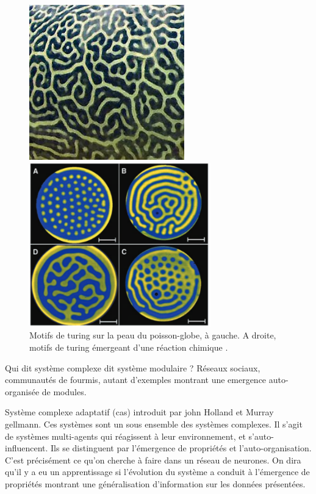 \begin{figure}
\begin{minipage}{0.5\textwidth}
\centering
\includegraphics[width=0.6\textwidth]{220px-Giant_Pufferfish_skin_pattern_detail.jpg}
\end{minipage}
\begin{minipage}{0.5\textwidth}
\centering
\includegraphics[width=0.7\textwidth]{turing_pattern_chem.pdf}
\end{minipage}
\caption{Motifs de turing sur la peau du poisson-globe, à gauche. A droite, motifs de turing émergeant d'une réaction chimique \cite{Horvth2009AnED}.}
\label{fig:turing_pattern}
\end{figure}

Qui dit système complexe dit système modulaire ?
Réseaux sociaux, communautés de fourmis, autant d'exemples montrant une emergence auto-organisée de modules. 


Système complexe adaptatif (cas) introduit par john Holland et Murray gellmann.
Ces systèmes sont un sous ensemble des systèmes complexes. Il s'agit de systèmes multi-agents qui réagissent à leur environnement, et s'auto-influencent. Ils se distinguent par l'émergence de propriétés et l'auto-organisation. C'est précisément ce qu'on cherche à faire dans un réseau de neurones. On dira qu'il y a eu un apprentissage si l'évolution du système a conduit à l'émergence de propriétés montrant une généralisation d'information sur les données présentées. 



